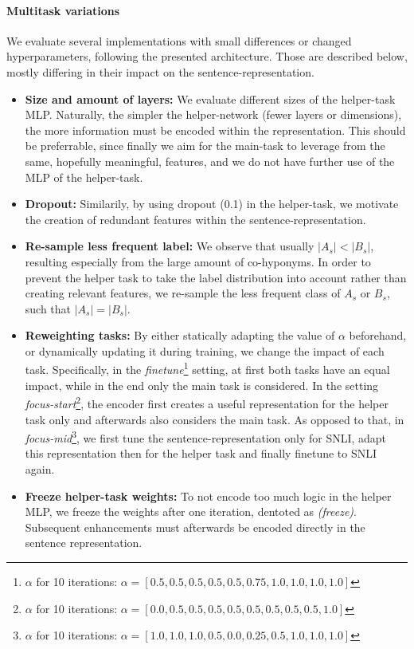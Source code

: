 \paragraph*{Multitask variations}
We evaluate several implementations with small differences or changed hyperparameters, following the presented architecture. Those are described below, mostly differing in their impact on the sentence-representation. 
\begin{itemize}
\item \textbf{Size and amount of layers:} We evaluate different sizes of the helper-task \ac{MLP}. Naturally, the simpler the helper-network (fewer layers or dimensions), the more information must be encoded within the representation. This should be preferrable, since finally we aim for the main-task to leverage from the same, hopefully meaningful, features, and we do not have further use of the \ac{MLP} of the helper-task.
\item  \textbf{Dropout:} Similarily, by using dropout (0.1) in the helper-task, we motivate the creation of redundant features within the sentence-representation.
\item \textbf{Re-sample less frequent label:} We observe that usually $|A_s| < |B_s|$, resulting especially from the large amount of co-hyponyms. In order to prevent the helper task to take the label distribution into account rather than creating relevant features, we re-sample the less frequent class of $A_s$ or $B_s$, such that $|A_s| = |B_s|$.
\item \textbf{Reweighting tasks:} By either statically adapting the value of $\alpha$ beforehand, or dynamically updating it during training, we change the impact of each task. Specifically, in the \textit{finetune}\footnote{$\alpha$ for 10 iterations: $\alpha = [0.5, 0.5, 0.5, 0.5, 0.5, 0.75, 1.0, 1.0, 1.0, 1.0]$} setting, at first both tasks have an equal impact, while in the end only the main task is considered. In the setting \textit{focus-start}\footnote{$\alpha$ for 10 iterations: $\alpha = [0.0, 0.5, 0.5, 0.5, 0.5, 0.5, 0.5, 0.5, 0.5, 1.0]$}, the encoder first creates a useful representation for the helper task only and afterwards also considers the main task. As opposed to that, in \textit{focus-mid}\footnote{$\alpha$ for 10 iterations: $\alpha = [1.0, 1.0, 1.0, 0.5, 0.0, 0.25, 0.5, 1.0, 1.0, 1.0]$}, we first tune the sentence-representation only for \ac{SNLI}, adapt this representation then for the helper task and finally finetune to \ac{SNLI} again.
\item \textbf{Freeze helper-task weights:} To not encode too much logic in the helper \ac{MLP}, we freeze the weights after one iteration, dentoted as \textit{(freeze)}. Subsequent enhancements must afterwards be encoded directly in the sentence representation. 

\end{itemize}
